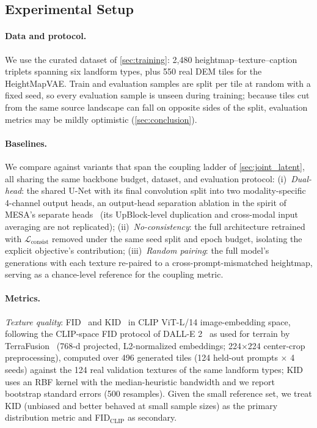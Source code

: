 \documentclass[review]{vgtc}                 %
\begin{document}
\subsection{Experimental Setup}
\label{sec:setup}

\paragraph{Data and protocol.}
We use the curated dataset of \cref{sec:training}: 2{,}480 heightmap--texture--caption triplets spanning six landform types, plus 550 real DEM tiles for the HeightMapVAE.
Train and evaluation samples are split per tile at random with a fixed seed, so every evaluation sample is unseen during training; because tiles cut from the same source landscape can fall on opposite sides of the split, evaluation metrics may be mildly optimistic (\cref{sec:conclusion}).

\paragraph{Baselines.}
We compare against variants that span the coupling ladder of \cref{sec:joint_latent}, all sharing the same backbone budget, dataset, and evaluation protocol:
(i)~\emph{Dual-head}: the shared U-Net with its final convolution split into two modality-specific 4-channel output heads, an output-head separation ablation in the spirit of MESA's separate heads~\cite{MESA:2025} (its UpBlock-level duplication and cross-modal input averaging are not replicated);
(ii)~\emph{No-consistency}: the full architecture retrained with $\mathcal{L}_{\text{consist}}$ removed under the same seed split and epoch budget, isolating the explicit objective's contribution;
(iii)~\emph{Random pairing}: the full model's generations with each texture re-paired to a cross-prompt-mismatched heightmap, serving as a chance-level reference for the coupling metric.

\paragraph{Metrics.}
\emph{Texture quality}: FID~\cite{heusel2017gans} and KID~\cite{binkowski2018demystifying} in CLIP ViT-L/14 image-embedding space, following the CLIP-space FID protocol of DALL-E 2~\cite{ramesh2022hierarchical} as used for terrain by TerraFusion~\cite{TerraFusion:2025}
(768-d projected, L2-normalized embeddings; 224$\times$224 center-crop preprocessing),
computed over 496 generated tiles (124 held-out prompts $\times$ 4 seeds) against the
124 real validation textures of the same landform types; KID uses an RBF kernel with
the median-heuristic bandwidth and we report bootstrap standard errors (500 resamples). Given the small reference set, we treat KID (unbiased and better behaved at small sample sizes) as the primary distribution metric and FID$_{\text{CLIP}}$ as secondary.
\end{document}

